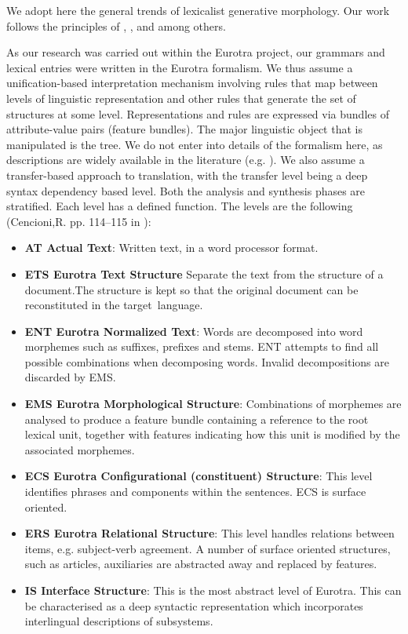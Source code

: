 We  adopt  here  the  general  trends  of  lexicalist  generative 
morphology.  Our  work follows the principles of \cite{Selkirk82}, 
\cite{Williams81a,Williams81b}, \cite{DiSciullo87} and \cite{Lieber83} 
among others.

As our research was carried out within the Eurotra  project,  our 
grammars   and  lexical  entries  were  written  in  the  Eurotra 
formalism.  We  thus  assume a  unification-based  interpretation 
mechanism  involving rules that map between levels of  linguistic 
representation   and  other  rules  that  generate  the  set   of 
structures at some level. Representations and rules are expressed 
via bundles of attribute-value pairs (feature bundles). The major 
linguistic  object  that is manipulated is the tree.   We do  not 
enter  into details of the formalism here,  as  descriptions  are 
widely available in the literature (e.g. \cite{Copeland91}). 
We also assume a transfer-based approach to translation, with the 
transfer  level  being a deep syntax dependency based  level.
Both the analysis and synthesis phases are stratified. Each level 
has a defined function. The levels are the following (Cencioni,R. 
pp. 114--115 in \cite{Copeland91}): 

\begin{itemize}
\item {\bf AT Actual Text}: Written text, in a word processor format.
\item {\bf ETS Eurotra Text Structure} \hspace{1mm}Separate the text from the structure of a
document.The structure is kept so that the original document  can be
reconstituted in the \mbox{target language}.
\item {\bf ENT  Eurotra  Normalized Text}:  Words are  decomposed  into  word 
morphemes
such as suffixes,  prefixes and stems.  ENT attempts to find  all possible
combinations when decomposing words. Invalid decompositions are
discarded by EMS.
\item {\bf EMS  Eurotra Morphological Structure}:  Combinations of  morphemes are
analysed  to  produce a feature bundle containing a reference  to 
the root
lexical unit, together with features indicating how this unit is
modified by the associated morphemes.
\item {\bf ECS Eurotra Configurational (constituent) Structure}: This level
identifies  phrases and components within the sentences.  ECS  is 
surface oriented.
\item {\bf ERS  Eurotra  Relational Structure}: This level  handles  relations 
between
items, e.g. subject-verb agreement. A number of surface oriented
structures, such as articles, auxiliaries are abstracted away and
replaced by features.
\item {\bf IS  Interface  Structure}:  This  is the most  abstract  level  of 
Eurotra. This
can be characterised  as a deep syntactic representation which
incorporates interlingual descriptions of subsystems.
\end{itemize}



